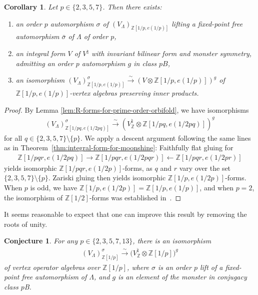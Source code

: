 \documentclass[pdftex]{sigma}
\newcommand{\bZ}{\mathbb{Z}}
\newcommand{\simto}{\overset{\sim}{\to}}
\newtheorem{conj}[thm]{Conjecture}
\newtheorem{cor}[thm]{Corollary}
\theoremstyle{definition}
\begin{document}
\begin{cor}
Let $p \in \{2,3,5,7\}$. Then there exists:
\begin{enumerate}\itemsep=0pt
\item[$1)$] an order $p$ automorphism $\sigma$ of $(V_\Lambda)_{\bZ[1/p,e(1/p)]}$ lifting a fixed-point free automorphism $\bar{\sigma}$ of $\Lambda$ of order $p$,
\item[$2)$] an integral form $V$ of $V^\natural$ with invariant bilinear form and monster symmetry, admitting an order $p$ automorphism $g$ in class $pB$,
\item[$3)$] an isomorphism $(V_\Lambda)_{\bZ[1/p,e(1/p)]}^\sigma \simto (V \otimes \bZ[1/p,e(1/p)])^g$ of $\bZ[1/p,e(1/p)]$-vertex algebras preserving inner products.
\end{enumerate}
\end{cor}
\begin{proof}By Lemma \ref{lem:R-forms-for-prime-order-orbifold}, we have isomorphisms
\begin{gather*} (V_\Lambda)_{\bZ[1/pq,e(1/2pq)]}^\sigma \simto (V^\natural_\bZ \otimes \bZ[1/pq,e(1/2pq)])^g \end{gather*}
for all $q \in \{2,3,5,7\} \setminus \{p\}$. We apply a descent argument following the same lines as in Theo\-rem~\ref{thm:integral-form-for-moonshine}: Faithfully flat gluing for
\begin{gather*} \bZ[1/pqr,e(1/2pq)] \to \bZ[1/pqr,e(1/2pqr)] \leftarrow \bZ[1/pqr,e(1/2pr)] \end{gather*}
yields isomorphic $\bZ[1/pqr,e(1/2p)]$-forms, as $q$ and $r$ vary over the set $\{2,3,5,7\} \setminus \{p\}$. Zariski gluing then yields isomorphic $\bZ[1/p,e(1/2p)]$-forms. When $p$ is odd, we have $\bZ[1/p,e(1/2p)] = \bZ[1/p,e(1/p)]$, and when $p=2$, the isomorphism of $\bZ[1/2]$-forms was established in~\cite{BR96}.
\end{proof}

It seems reasonable to expect that one can improve this result by removing the roots of unity.

\begin{conj}
For any $p \in \{2,3,5,7,13\}$, there is an isomorphism
\begin{gather*} (V_\Lambda)_{\bZ[1/p]}^\sigma \simto \big(V^\natural_\bZ \otimes \bZ[1/p]\big)^g \end{gather*}
of vertex operator algebras over $\bZ[1/p]$, where $\sigma$ is an order $p$ lift of a fixed-point free automorphism of $\Lambda$, and $g$ is an element of the monster in conjugacy class $p$B.
\end{conj}
\end{document}
